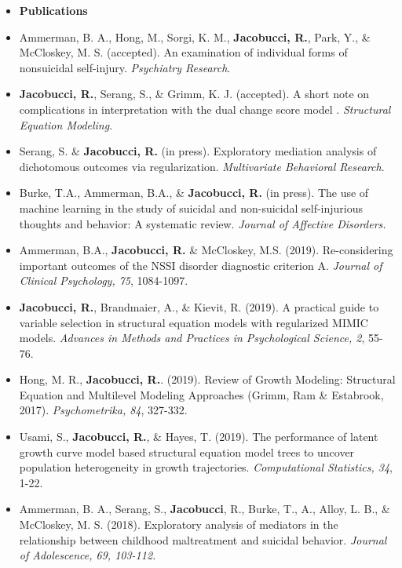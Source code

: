 \documentclass[letterpaper,10pt]{article}
\newlength{\outerbordwidth}
\newcommand{\resheading}[1]{\vspace{8pt}
  \parbox{\textwidth}{\setlength{\FrameSep}{\outerbordwidth}
    \begin{shaded}
\setlength{\fboxsep}{0pt}\framebox[\textwidth][l]{\setlength{\fboxsep}{4pt}\fcolorbox{shadecolorB}{shadecolorB}{\textbf{\sffamily{\mbox{~}\makebox[6.762in][l]{\large #1} \vphantom{p\^{E}}}}}}
    \end{shaded}
  }\vspace{-5pt}
}
\begin{document}
\resheading{Publications}
\begin{itemize} 
\setlength{\topsep}{0pt}%
\setlength{\leftmargin}{0.1in}%
\setlength{\listparindent}{-0.1in}%
\setlength{\itemindent}{-0.2in}%
\setlength{\parsep}{\parskip}%

\item {\textbf{\large{Publications}}}
%
\item[] Ammerman, B. A., Hong, M., Sorgi, K. M., \textbf{Jacobucci, R.}, Park, Y., \& McCloskey, M. S. (accepted). An examination of individual forms of nonsuicidal self-injury. \emph{Psychiatry Research}.
%
\item[] \textbf{Jacobucci, R.}, Serang, S., \& Grimm, K. J. (accepted). A short note on complications in interpretation with the dual change score model . \emph{Structural Equation Modeling}.
% 
\item[]Serang, S. \& \textbf{Jacobucci, R.} (in press). Exploratory mediation analysis of dichotomous outcomes via regularization. \emph{Multivariate Behavioral Research}.
%
\item[] Burke, T.A., Ammerman, B.A., \& \textbf{Jacobucci, R.} (in press). The use of machine learning in the study of suicidal and non-suicidal self-injurious thoughts and behavior: A systematic review. \emph{Journal of Affective Disorders.}
%
\item[] Ammerman, B.A., \textbf{Jacobucci, R.} \& McCloskey, M.S. (2019). Re-considering important outcomes of the NSSI disorder diagnostic criterion A. \emph{Journal of Clinical Psychology, 75}, 1084-1097.
% 
\item[] \textbf{Jacobucci, R.}, Brandmaier, A., \& Kievit, R. (2019). A practical guide to variable selection in structural equation models with regularized MIMIC models. \emph{Advances in Methods and Practices in Psychological Science, 2}, 55-76.  
% 
\item[]Hong, M. R., \textbf{Jacobucci, R.}. (2019). Review of Growth Modeling: Structural Equation and Multilevel Modeling Approaches (Grimm, Ram \& Estabrook, 2017). \emph{Psychometrika, 84}, 327-332.
%
\item[] Usami, S., \textbf{Jacobucci, R.}, \& Hayes, T. (2019). The performance of latent growth curve model based structural equation model trees to uncover population heterogeneity in growth trajectories. \emph{Computational Statistics, 34}, 1-22.
%
\item[]Ammerman, B. A., Serang, S., \textbf{Jacobucci}, R., Burke, T., A., Alloy, L. B., \& McCloskey, M. S. (2018). Exploratory analysis of mediators in the relationship between childhood maltreatment and suicidal behavior. \emph{Journal of Adolescence, 69, 103-112.}

\end{itemize}
\end{document}
